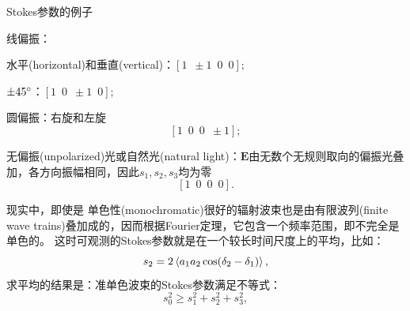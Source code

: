 \begin{example}{Stokes参数的例子}{}
    \begin{compactitem}
    	\item 线偏振：
        \begin{compactitem}
            \item 水平(horizontal)和垂直(vertical)：$[1\enspace\pm 1\enspace0\enspace0];$
            \item $\pm 45^\circ$：$[1\enspace0\enspace\pm 1\enspace0];$
        \end{compactitem}
    	\item 圆偏振：右旋和左旋
    	\[
            [1\enspace0\enspace0\enspace\pm 1];
        \]
    	\item 无偏振(unpolarized)光或自然光(natural light)：$\bm E$由无数个无规则取向的偏振光叠加，各方向振幅相同，因此$s_1,s_2,s_3$均为零
        \[
            [1\enspace0\enspace0\enspace0].
        \]
    \end{compactitem}
\end{example}
\begin{remark}
    现实中，即使是%
    单色性(monochromatic)很好的辐射波束也是由有限波列(finite wave trains)叠加成的，因而根据Fourier定理，它包含一个频率范围，即不完全是单色的。%
    这时可观测的Stokes参数就是在一个较长时间尺度上的平均，比如：
    \[
        s_2=2\left\langle a_1a_2\cos(\mathop{}\!\delta_2-\mathop{}\!\delta_1)\right\rangle,
    \]
    求平均的结果是：准单色波束的Stokes参数满足不等式：
    \[
        s_0^2\geqslant s_1^2+s_2^2+s_3^2,
    \]
\end{remark}

